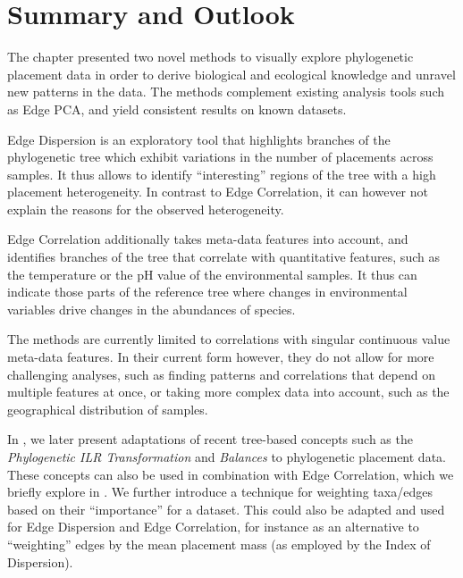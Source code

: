 
\section{Summary and Outlook}
\label{ch:Visualization:sec:SummaryOutlook}


The chapter presented two novel methods to visually explore phylogenetic placement data
in order to derive biological and ecological knowledge and unravel new patterns in the data.
The methods complement existing analysis tools such as Edge PCA,
and yield consistent results on known datasets.

Edge Dispersion is an exploratory tool that highlights branches of the phylogenetic tree
which exhibit variations in the number of placements across samples.
It thus allows to identify ``interesting'' regions of the tree with a high placement heterogeneity.
In contrast to Edge Correlation, it can however not explain the reasons for the observed heterogeneity.

Edge Correlation additionally takes meta-data features into account,
and identifies branches of the tree that correlate with quantitative features,
such as the temperature or the pH value of the environmental samples.
It thus can indicate those parts of the reference tree where changes in environmental variables
drive changes in the abundances of species.


The methods are currently limited to correlations with singular continuous value meta-data features.
In their current form however, they do not allow for more challenging analyses,
such as finding patterns and correlations that depend on multiple features at once,
or taking more complex data into account, such as the geographical distribution of samples.

In , we later present adaptations of recent tree-based concepts
such as the \emph{Phylogenetic ILR Transformation} and \emph{Balances} \cite{Silverman2017} to phylogenetic placement data.
These concepts can also be used in combination with Edge Correlation,
which we briefly explore in .
We further introduce a technique for weighting taxa/edges based on their ``importance'' for a dataset.
This could also be adapted and used for Edge Dispersion and Edge Correlation,
for instance as an alternative to ``weighting'' edges by the mean placement mass
(as employed by the Index of Dispersion).

